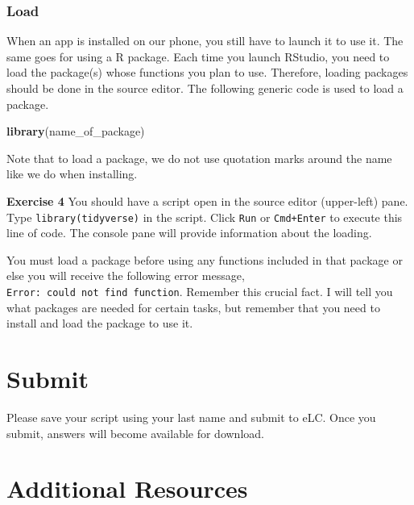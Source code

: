 \documentclass[
]{book}
\newenvironment{Shaded}{\begin{snugshade}}{\end{snugshade}}
\newcommand{\KeywordTok}[1]{\textcolor[rgb]{0.13,0.29,0.53}{\textbf{#1}}}
\newcommand{\NormalTok}[1]{#1}
\newenvironment{learncheck}%
{%
  \par\vspace{\baselineskip}\noindent 
  \color{Exercise}\begin{itshape}%
  \par\vspace{\baselineskip}\noindent\ignorespaces 
}%
{%
  \end{itshape}\ignorespacesafterend 
}
\begin{document}
\hypertarget{load}{%
\subsubsection*{Load}\label{load}}

When an app is installed on our phone, you still have to launch it to use it. The same goes for using a R package. Each time you launch RStudio, you need to load the package(s) whose functions you plan to use. Therefore, loading packages should be done in the source editor. The following generic code is used to load a package.

\begin{Shaded}
\begin{Highlighting}[]
\KeywordTok{library}\NormalTok{(name_of_package)}
\end{Highlighting}
\end{Shaded}

Note that to load a package, we do not use quotation marks around the name like we do when installing.

\begin{learncheck}
\textbf{Exercise 4} You should have a script open in the source editor
(upper-left) pane. Type \texttt{library(tidyverse)} in the script. Click
\texttt{Run} or \texttt{Cmd+Enter} to execute this line of code. The
console pane will provide information about the loading.
\end{learncheck}

You must load a package before using any functions included in that package or else you will receive the following error message, \texttt{Error:\ could\ not\ find\ function}. Remember this crucial fact. I will tell you what packages are needed for certain tasks, but remember that you need to install and load the package to use it.

\hypertarget{submit}{%
\section{Submit}\label{submit}}

Please save your script using your last name and submit to eLC. Once you submit, answers will become available for download.

\hypertarget{additional-resources}{%
\section{Additional Resources}\label{additional-resources}}
\end{document}
